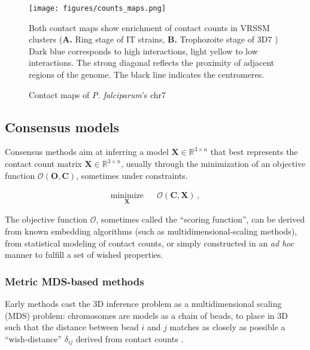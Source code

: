 \documentclass[2columns]{article}
\newcommand{\Xb}{\textbf{X}}
\newcommand{\RR}{\mathbb{R}}
\begin{document}
\begin{figure}
\begin{center}
\texttt{[image: figures/counts\_maps.png]}
\end{center}
\caption{Contact maps of {\em P. falciparum}'s chr7}{ \small Both contact maps show
enrichment of contact counts in VRSSM clusters (\textbf{A.} Ring stage 
\citep{lemieux:genome-wide} of IT strains, \textbf{B.} 
Trophozoite stage of 3D7 \citep{ay:three-dimensional}) 
Dark blue corresponds to high interactions, light yellow to low interactions.
The strong diagonal reflects the proximity of adjacent regions of the genome.
The black line indicates the centromeres. }
\end{figure}

\subsection*{Consensus models}

Consensus methods aim at inferring a model $\mathbf{X} \in \RR^{3 \times n}$
that best represents the contact count matrix $\mathbf{X} \in \RR^{3 \times
n}$, usually through the minimization of an objective function
$\mathcal{O}(\mathbf{O}, \mathbf{C})$, sometimes under constraints.

\begin{equation*}
\renewcommand{\arraystretch}{2}
\begin{array}{ccl}
\underset{\Xb}{\text{minimize}} & & \mathcal{O}(\mathbf{C}, \Xb) \,,
\end{array}
\end{equation*}

The objective function $\mathcal{O}$, sometimes called the ``scoring
function'', can be derived from known embedding algorithms (such as
multidimensional-scaling methods), from statistical modeling of contact
counts, or simply constructed in an \textit{ad hoc} manner to fulfill a set of
wished properties.

\subsubsection*{Metric MDS-based methods}

Early methods cast the 3D inference problem as a
multidimensional scaling (MDS) problem: chromosomes are models as a chain of
beads, to place in 3D such that the distance between bead $i$ and $j$ matches
as closely as possible a ``wish-distance'' $\delta_{ij}$ derived from contact
counts \citep{dekker:capturing, duan:three-dimensional,
tanizawa:mapping, ay:three-dimensional} .
\end{document}
